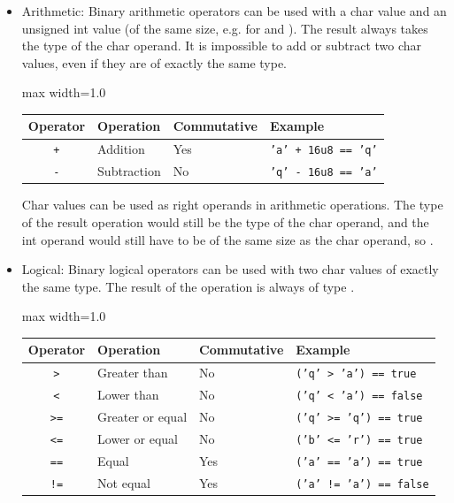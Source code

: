 \begin{itemize}
  \setlength\itemsep{-4pt}
\item Arithmetic: Binary arithmetic operators can be used with a char value and
  an unsigned int value (of the same size, e.g. for  and
  ). The result always takes the type of the char operand. It is
  impossible to add or subtract two char values, even if they are of exactly the
  same type.

  \begin{center}
    \begin{adjustbox}{max width=1.0\linewidth}
      \begin{tabular}{|c|lll|}
        \hline
        Operator & Operation & Commutative & Example\\[0pt]
        \hline
        \hline
        \texttt{+} & Addition & Yes & \texttt{'a' + 16u8 == 'q'}\\[0pt]
        \texttt{-} & Subtraction & No & \texttt{'q' - 16u8 == 'a'}\\[0pt]
        \hline
      \end{tabular}
  \end{adjustbox}\end{center}


  Char values can be used as right operands in arithmetic operations. The type of
  the result operation would still be the type of the char operand, and the int
  operand would still have to be of the same size as the char operand, so
  .

\item Logical: Binary logical operators can be used with two char values of
  exactly the same type. The result of the operation is always of type
  .

  \begin{center}
    \begin{adjustbox}{max width=1.0\linewidth}
      \begin{tabular}{|c|lll|}
        \hline
        Operator & Operation & Commutative & Example\\[0pt]
        \hline
        \hline
        \texttt{>} & Greater than & No & \texttt{('q' > 'a') == true}\\[0pt]
        \texttt{<} & Lower than & No & \texttt{('q' < 'a') == false}\\[0pt]
        \texttt{>=} & Greater or equal & No & \texttt{('q' >= 'q') == true}\\[0pt]
        \texttt{<=} & Lower or equal & No & \texttt{('b' <= 'r') == true}\\[0pt]
        \texttt{==} & Equal & Yes & \texttt{('a' == 'a') == true}\\[0pt]
        \texttt{!=} & Not equal & Yes & \texttt{('a' != 'a') == false}\\[0pt]
        \hline
      \end{tabular}
  \end{adjustbox}\end{center}


\end{itemize}
